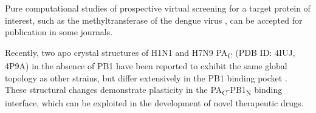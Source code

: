 Pure computational studies of prospective virtual screening for a target protein of interest, such as the methyltransferase of the dengue virus \citep{1435}, can be accepted for publication in some journals.

Recently, two apo crystal structures of H1N1 and H7N9 PA\textsubscript{C} (PDB ID: 4IUJ, 4P9A) in the absence of PB1 have been reported to exhibit the same global topology as other strains, but differ extensively in the PB1 binding pocket \citep{1585}. These structural changes demonstrate plasticity in the PA\textsubscript{C}-PB1\textsubscript{N} binding interface, which can be exploited in the development of novel therapeutic drugs.

\chapterend
